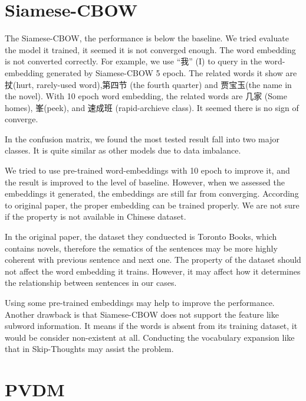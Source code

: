 \section{Siamese-CBOW}

\begin{CJK}{UTF8}{gbsn}
The Siamese-CBOW, the performance is below the baseline. We tried evaluate the model it trained, it seemed it is not converged enough. 
The word embedding is not converted correctly. For example, we use \enquote{我} (I) to query in the word-embedding generated by Siamese-CBOW 5 epoch. 
The related words it show are 扙(hurt, rarely-used word),第四节 (the fourth quarter) and 贾宝玉(the name in the novel). With 10 epoch word embedding, the  
related words are 几家 (Some homes), 峯(peek), and 速成班 (rapid-archieve class). It seemed there is no sign of converge.
\end{CJK}

In the confusion matrix, we found the most tested result fall into two major classes.
It is quite similar as other models due to data imbalance.

We tried to use pre-trained word-embeddings with 10 epoch to improve it, and the result is improved to the level of baseline.
However, when we assessed the embeddings it generated, the embeddings are still far from converging. 
According to original paper, the proper embedding can be trained properly. 
We are not sure if the property is not available in Chinese dataset.

In the original paper, the dataset they conduected is Toronto Books, which contains novels,
 therefore the sematics of the sentences may be more highly coherent with previous sentence and next one. 
The property of the dataset should not affect the word embedding it trains. 
However, it may affect how it determines the relationship between sentences in our cases.

Using some pre-trained embeddings may help to improve the performance. 
Another drawback is that Siamese-CBOW does not support the feature like subword information.
It means if the words is absent from its training dataset, it would be consider non-existent at all. Conducting the vocabulary expansion like that in Skip-Thoughts may assist the problem.


\section{PVDM}

